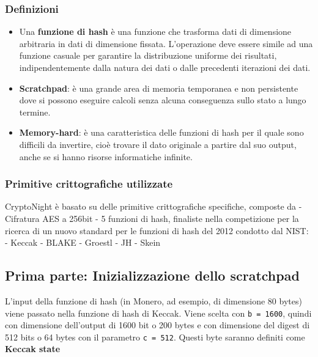 \documentclass[
]{article}
\begin{document}
\subsubsection{Definizioni}\label{definizioni}

\begin{itemize}
\item
  Una \textbf{funzione di hash} è una funzione che trasforma dati di
  dimensione arbitraria in dati di dimensione fissata. L'operazione deve
  essere simile ad una funzione casuale per garantire la distribuzione
  uniforme dei risultati, indipendentemente dalla natura dei dati o
  dalle precedenti iterazioni dei dati.
\item
  \textbf{Scratchpad}: è una grande area di memoria temporanea e non
  persistente dove si possono eseguire calcoli senza alcuna conseguenza
  sullo stato a lungo termine.
\item
  \textbf{Memory-hard}: è una caratteristica delle funzioni di hash per
  il quale sono difficili da invertire, cioè trovare il dato originale a
  partire dal suo output, anche se si hanno risorse informatiche
  infinite.
\end{itemize}

\subsubsection{Primitive crittografiche
utilizzate}\label{primitive-crittografiche-utilizzate}

CryptoNight è basato su delle primitive crittografiche specifiche,
composte da - Cifratura AES a 256bit - 5 funzioni di hash, finaliste
nella competizione per la ricerca di un nuovo standard per le funzioni
di hash del 2012 condotto dal NIST: - Keccak - BLAKE - Groestl - JH -
Skein

\subsection{Prima parte: Inizializzazione dello
scratchpad}\label{prima-parte-inizializzazione-dello-scratchpad}

L'input della funzione di hash (in Monero, ad esempio, di dimensione 80
bytes) viene passato nella funzione di hash di Keccak. Viene scelta con
\texttt{b\ =\ 1600}, quindi con dimensione dell'output di 1600 bit o 200
bytes e con dimensione del digest di 512 bits o 64 bytes con il
parametro \texttt{c\ =\ 512}. Questi byte saranno definiti come
\textbf{Keccak state}
\end{document}
